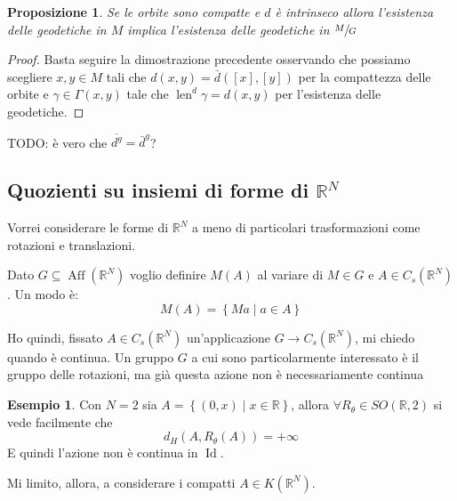 \documentclass[a4paper,10pt]{article}
\newcounter{counter1}
\theoremstyle{plain}
\newtheorem{mypro}[counter1]{Proposizione}
\theoremstyle{definition}
\newtheorem{myes}[counter1]{Esempio}
\theoremstyle{remark}
\newcommand{\obar}[1]{\overline{#1}}
\newcommand{\set}[1]{\left\{#1\right\}}
\newcommand{\pa}[1]{\left(#1\right)}
\newcommand{\bra}[1]{\left[#1\right]}
\DeclareMathOperator{\id}{Id}
\DeclareMathOperator{\len}{len}
\DeclareMathOperator{\aff}{Aff}
\begin{document}
\begin{mypro}
  Se le orbite sono compatte e $d$ è intrinseco allora l'esistenza
  delle geodetiche in $M$ implica l'esistenza delle geodetiche in
  $\sfrac{M}{G}$
\end{mypro}
\begin{proof}
  Basta seguire la dimostrazione precedente osservando che possiamo
  scegliere $x,y \in M$ tali che $d(x,y) = \bar d (\bra{x}, \bra{y})$
  per la compattezza delle orbite e $\gamma \in \Gamma\pa{x,y}$ tale che
  $\len ^d \gamma = d(x,y)$ per l'esistenza delle geodetiche.
\end{proof}

TODO: è vero che $\obar{d^g} = \bar d ^g$?

\subsection{Quozienti su insiemi di forme di $\mathbb{R}^N$}

Vorrei considerare le forme di $\mathbb{R}^N$ a meno di particolari
trasformazioni come rotazioni e translazioni.

Dato $G \subseteq \aff(\mathbb{R}^N)$ voglio definire $M(A)$ al
variare di $M \in G$ e $A \in C_s(\mathbb{R}^N)$. Un modo è:
\[ M(A) = \set{ Ma \mid a \in A } \]

Ho quindi, fissato $A \in C_s(\mathbb{R}^N)$ un'applicazione $G \to
C_s(\mathbb{R}^N)$, mi chiedo quando è continua. Un gruppo $G$ a cui
sono particolarmente interessato è il gruppo delle rotazioni, ma già
questa azione non è necessariamente continua
\begin{myes}
  Con $N = 2$ sia $A = \set{(0,x) \mid x \in \mathbb{R}}$, allora
  $\forall R_\theta \in SO(\mathbb{R},2)$ si vede facilmente che
  \[ d_H(A, R_\theta (A)) = + \infty \] 
  E quindi l'azione non è continua in $\id$.
\end{myes}

Mi limito, allora, a considerare i compatti $A \in K(\mathbb{R}^N)$.
\end{document}
